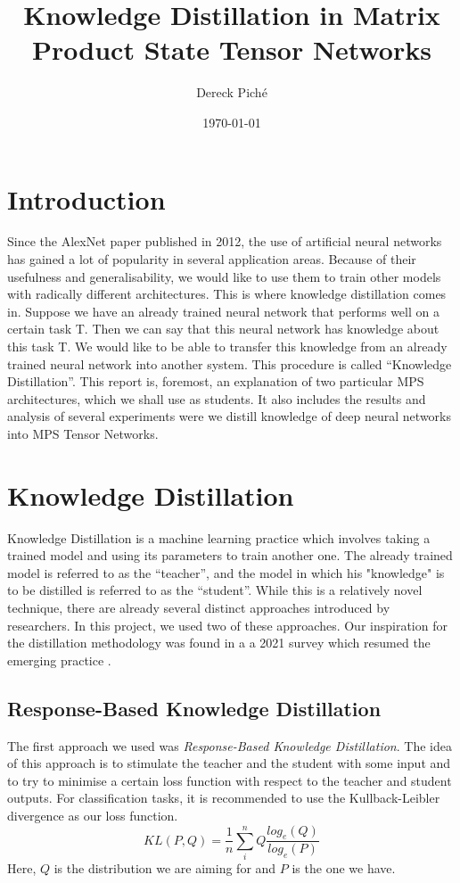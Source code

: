 \documentclass{article}
\title{Knowledge Distillation in Matrix Product State Tensor Networks}
\author{Dereck Piché}
\date{\today}
\theoremstyle{definition}
\theoremstyle{definition}
\begin{document}
\maketitle

\section{Introduction}
Since the AlexNet\cite{alexnet} paper published in 2012, the use of artificial neural networks has gained a lot of popularity in several application areas. Because of their usefulness and generalisability, we would like to use them to train other models with radically different architectures. This is where knowledge distillation comes in. Suppose we have an already trained neural network that performs well on a certain task T. Then we can say that this neural network has knowledge about this task T. We would like to be able to transfer this knowledge from an already trained neural network into another system. This procedure is called \enquote{Knowledge Distillation}. This report is, foremost, an explanation of two particular MPS architectures, which we shall use as students. It also includes the results and analysis of several experiments were we distill knowledge of deep neural networks into MPS Tensor Networks.


\section{Knowledge Distillation}
Knowledge Distillation is a machine learning practice which involves
taking a trained model and using its parameters to train another one.
The already trained model is referred to as the \enquote{teacher}, and 
the model in which his "knowledge" is to be distilled is referred to as
the \enquote{student}. While this is a relatively novel technique, there are 
already several distinct approaches introduced by researchers.
In this project, we used two of these approaches. Our inspiration for the distillation 
methodology was found in a a 2021 survey which resumed the emerging 
practice \cite{Gou_2021}.

\subsection{Response-Based Knowledge Distillation}
The first approach we used was \emph{Response-Based Knowledge Distillation}. The idea of this approach is to stimulate the teacher and the student with some input and to try to minimise a certain loss function with respect to the teacher and student outputs. For classification tasks, it is recommended to use the Kullback-Leibler divergence as our loss function. 
\begin{equation}
    KL(P, Q) = \frac{1}{n} \sum_i^n Q \frac{log_e(Q)}{log_e(P)}
\end{equation}
Here, $Q$ is the distribution we are aiming for and $P$ is the one we have.
\end{document}
